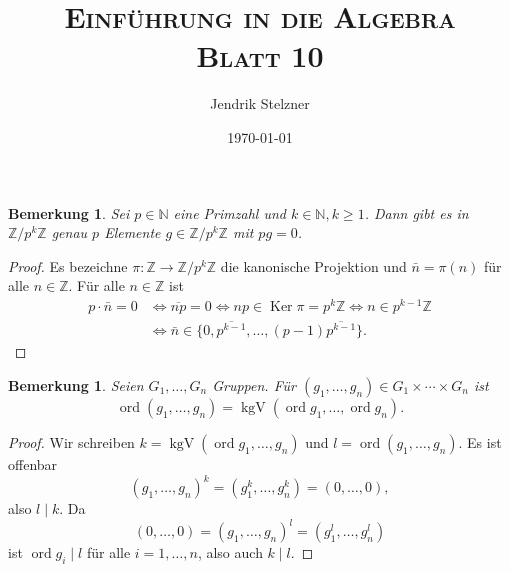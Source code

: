 \documentclass[a4paper,10pt]{article}
\title{\textsc{Einführung in die Algebra \\ \Large Blatt 10}}
\author{Jendrik Stelzner}
\date{\today}
\newcounter{satze}
\newtheorem{bem}[satze]{Bemerkung}
\theoremstyle{definition}
\newcommand{\N}{\mathbb{N}}
\newcommand{\Z}{\mathbb{Z}}
\newcommand{\ord}{\operatorname{ord}}
\newcommand{\kgV}{\operatorname{kgV}}
\newcommand{\Ker}{\operatorname{Ker}}
\begin{document}
\maketitle





\addtocounter{section}{1}





\section{}


\begin{bem}\label{bem: elemente der ordnung p}
 Sei $p \in \N$ eine Primzahl und $k \in \N, k \geq 1$. Dann gibt es in $\Z/p^k\Z$ genau $p$ Elemente $g \in \Z/p^k\Z$ mit $pg = 0$.
\end{bem}
\begin{proof}
 Es bezeichne $\pi : \Z \rightarrow \Z/p^k\Z$ die kanonische Projektion und $\bar{n} = \pi(n)$ für alle $n \in \Z$. Für alle $n \in \Z$ ist
 \begin{align*}
  p \cdot \bar{n} = 0
  &\Leftrightarrow \overline{np} = 0
  \Leftrightarrow np \in \Ker \pi = p^k\Z
  \Leftrightarrow n \in p^{k-1}\Z \\
  &\Leftrightarrow \bar{n} \in \{0,\overline{p^{k-1}},\ldots,(p-1)\overline{p^{k-1}}\}.
 \end{align*}
\end{proof}


\begin{bem}\label{bem: Ordnung im Produkt}
 Seien $G_1, \ldots, G_n$ Gruppen. Für $(g_1, \ldots, g_n) \in G_1 \times \cdots \times G_n$ ist
 \[
  \ord (g_1, \ldots, g_n) = \kgV(\ord g_1, \ldots, \ord g_n).
 \]
\end{bem}
\begin{proof}
 Wir schreiben $k = \kgV(\ord g_1, \ldots, g_n)$ und $l = \ord (g_1, \ldots, g_n)$. Es ist offenbar
 \[
  (g_1, \ldots, g_n)^k = (g_1^k, \ldots, g_n^k) = (0, \ldots, 0),
 \]
 also $l \mid k$. Da
 \[
  (0, \ldots, 0) = (g_1, \ldots, g_n)^l = (g_1^l, \ldots, g_n^l)
 \]
 ist $\ord g_i \mid l$ für alle $i = 1, \ldots, n$, also auch $k \mid l$.
\end{proof}
\end{document}
